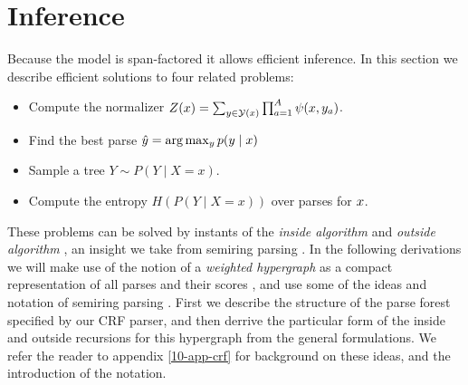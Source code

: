 \section{Inference}
\label{sect:inference}
Because the model is span-factored it allows efficient inference. In this section we describe efficient solutions to four related problems:
\begin{itemize}
  \item Compute the normalizer $Z(x) = \sum_{ y \in \mathcal{Y}(x) } \prod_{ a=1 }^{ A } \psi( x, y_a )$.
  \item Find the best parse $\hat{ y } = \arg \max_{y } p(y  \mid x)$
  \item Sample a tree $Y \sim P(Y \mid X = x)$. %
  \item Compute the entropy $H(P(Y \mid X = x))$ over parses for $x$.
\end{itemize}
These problems can be solved by instants of the \textit{inside algorithm} and \textit{outside algorithm} \citep{baker1979trainable}, an insight we take from semiring parsing \citep{goodman1999semiring}. In the following derivations we will make use of the notion of a \textit{weighted hypergraph} as a compact representation of all parses and their scores \citep{gallo1993directed,klein2004parsing}, and use some of the ideas and notation of semiring parsing \citep{goodman1999semiring,eisner2009semirings}. First we describe the structure of the parse forest specified by our CRF parser, and then derrive the particular form of the inside and outside recursions for this hypergraph from the general formulations. We refer the reader to appendix \ref{10-app-crf} for background on these ideas, and the introduction of the notation.

